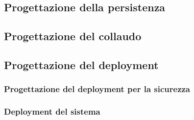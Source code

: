 \documentclass[a4paper, 11pt]{article}
\begin{document}
\subsection{Progettazione della persistenza}
\subsection{Progettazione del collaudo}
\subsection{Progettazione del deployment}
\subsubsection*{Progettazione del deployment per la sicurezza}
\subsubsection*{Deployment del sistema}
\end{document}
